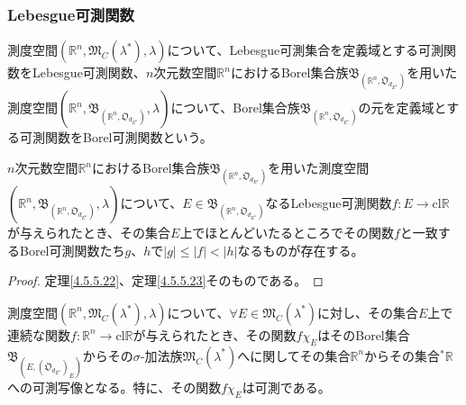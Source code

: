 \documentclass[dvipdfmx]{jsarticle}
\begin{document}
\subsubsection{Lebesgue可測関数}%
\begin{dfn}
測度空間$\left( \mathbb{R}^{n},\mathfrak{M}_{C}\left( \lambda^{*} \right),\lambda \right)$について、Lebesgue可測集合を定義域とする可測関数をLebesgue可測関数、$n$次元数空間$\mathbb{R}^{n}$におけるBorel集合族$\mathfrak{B}_{\left( \mathbb{R}^{n},\mathfrak{O}_{d_{E^{n}}} \right)}$を用いた測度空間$\left( \mathbb{R}^{n},\mathfrak{B}_{\left( \mathbb{R}^{n},\mathfrak{O}_{d_{E^{n}}} \right)},\lambda \right)$について、Borel集合族$\mathfrak{B}_{\left( \mathbb{R}^{n},\mathfrak{O}_{d_{E^{n}}} \right)}$の元を定義域とする可測関数をBorel可測関数という。
\end{dfn}
\begin{thm}\label{4.5.5.24}
$n$次元数空間$\mathbb{R}^{n}$におけるBorel集合族$\mathfrak{B}_{\left( \mathbb{R}^{n},\mathfrak{O}_{d_{E^{n}}} \right)}$を用いた測度空間$\left( \mathbb{R}^{n},\mathfrak{B}_{\left( \mathbb{R}^{n},\mathfrak{O}_{d_{E^{n}}} \right)},\lambda \right)$について、$E \in \mathfrak{B}_{\left( \mathbb{R}^{n},\mathfrak{O}_{d_{E^{n}}} \right)}$なるLebesgue可測関数$f:E \rightarrow \mathrm{cl}\mathbb{R}$が与えられたとき、その集合$E$上でほとんどいたるところでその関数$f$と一致するBorel可測関数たち$g$、$h$で$|g| \leq |f| < |h|$なるものが存在する。
\end{thm}
\begin{proof} 定理\ref{4.5.5.22}、定理\ref{4.5.5.23}そのものである。
\end{proof}
\begin{thm}\label{4.5.5.25}
測度空間$\left( \mathbb{R}^{n},\mathfrak{M}_{C}\left( \lambda^{*} \right),\lambda \right)$について、$\forall E \in \mathfrak{M}_{C}\left( \lambda^{*} \right)$に対し、その集合$E$上で連続な関数$f:\mathbb{R}^{n} \rightarrow \mathrm{cl}\mathbb{R}$が与えられたとき、その関数$f\chi_{E}$はそのBorel集合$\mathfrak{B}_{\left( E,\left( \mathfrak{O}_{d_{E^{n}}} \right)_{E} \right)}$からその$\sigma$-加法族$\mathfrak{M}_{C}\left( \lambda^{*} \right)$へに関してその集合$\mathbb{R}^{n}$からその集合${}^{*}\mathbb{R}$への可測写像となる。特に、その関数$f\chi_{E}$は可測である。
\end{thm}
\end{document}
